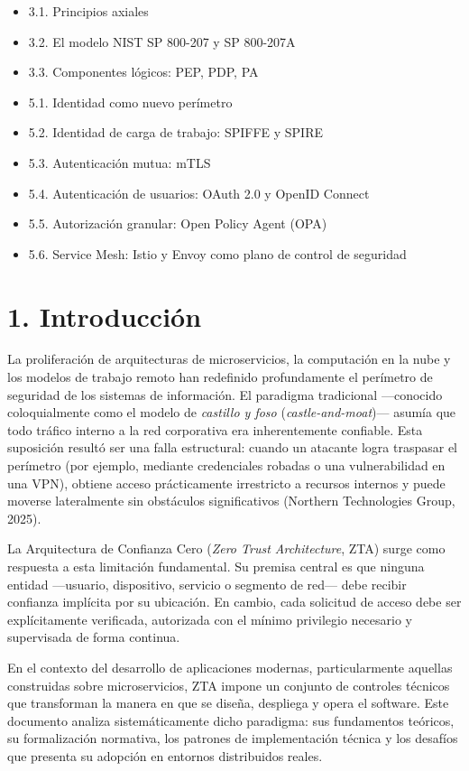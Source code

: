 \documentclass[12pt,a4paper]{article}
\begin{document}
\begin{itemize}
  \item 3.1. Principios axiales
  \item 3.2. El modelo NIST SP 800-207 y SP 800-207A
  \item 3.3. Componentes lógicos: PEP, PDP, PA
  \item 5.1. Identidad como nuevo perímetro
  \item 5.2. Identidad de carga de trabajo: SPIFFE y SPIRE
  \item 5.3. Autenticación mutua: mTLS
  \item 5.4. Autenticación de usuarios: OAuth 2.0 y OpenID Connect
  \item 5.5. Autorización granular: Open Policy Agent (OPA)
  \item 5.6. Service Mesh: Istio y Envoy como plano de control de seguridad
\end{itemize}



\section{1. Introducción}

La proliferación de arquitecturas de microservicios, la computación en la nube y los modelos de trabajo remoto han redefinido profundamente el perímetro de seguridad de los sistemas de información. El paradigma tradicional —conocido coloquialmente como el modelo de \textit{castillo y foso} (\textit{castle-and-moat})— asumía que todo tráfico interno a la red corporativa era inherentemente confiable. Esta suposición resultó ser una falla estructural: cuando un atacante logra traspasar el perímetro (por ejemplo, mediante credenciales robadas o una vulnerabilidad en una VPN), obtiene acceso prácticamente irrestricto a recursos internos y puede moverse lateralmente sin obstáculos significativos (Northern Technologies Group, 2025).

La Arquitectura de Confianza Cero (\textit{Zero Trust Architecture}, ZTA) surge como respuesta a esta limitación fundamental. Su premisa central es que ninguna entidad —usuario, dispositivo, servicio o segmento de red— debe recibir confianza implícita por su ubicación. En cambio, cada solicitud de acceso debe ser explícitamente verificada, autorizada con el mínimo privilegio necesario y supervisada de forma continua.

En el contexto del desarrollo de aplicaciones modernas, particularmente aquellas construidas sobre microservicios, ZTA impone un conjunto de controles técnicos que transforman la manera en que se diseña, despliega y opera el software. Este documento analiza sistemáticamente dicho paradigma: sus fundamentos teóricos, su formalización normativa, los patrones de implementación técnica y los desafíos que presenta su adopción en entornos distribuidos reales.
\end{document}
